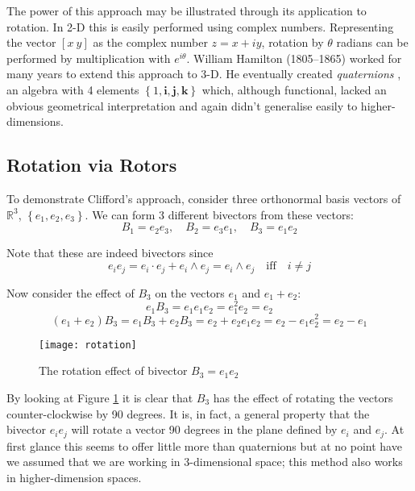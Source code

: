 The power of this approach may be illustrated through its application
to rotation. In 2-D this is easily performed using complex numbers. Representing
the vector $[x\ y]$ as the complex number $z = x + iy$, rotation by
$\theta$ radians can be performed by multiplication with $e^{i\theta}$.
William Hamilton (1805--1865) worked for many years to extend this approach
to 3-D. He eventually created \emph{quaternions} \cite{hamilton2,hamilton1},
an algebra with 4 
elements $\left\{1, \mathbf{i}, \mathbf{j}, \mathbf{k}\right\}$ which, although
functional, lacked an obvious geometrical interpretation and again didn't
generalise easily to higher-dimensions.

\subsection{Rotation via Rotors}

To demonstrate Clifford's approach, consider three orthonormal basis
vectors of $\mathbb{R}^3$, $\left\{e_1, e_2, e_3\right\}$. We can form
3 different bivectors from these vectors:
\begin{displaymath}
B_1 = e_2e_3,\quad B_2 = e_3e_1,\quad B_3 = e_1e_2
\end{displaymath}

Note that these are indeed bivectors since
\[
e_ie_j = e_i \cdot e_j + e_i \wedge e_j = e_i \wedge e_j \quad \mbox{iff} \quad i \ne j
\]

Now consider the effect of $B_3$ on the vectors $e_1$ and $e_1 + e_2$:
\begin{displaymath}
e_1B_3 = e_1e_1e_2 = e_1^2e_2=e_2 
\end{displaymath}
\begin{displaymath}
(e_1 + e_2)B_3 = e_1B_3 + e_2B_3 = e_2 + e_2e_1e_2 = e_2 - e_1e_2^2 = e_2 - e_1
\end{displaymath}

\begin{figure}
\centering
\texttt{[image: rotation]}
\caption{The rotation effect of bivector $B_3 = e_1e_2$\label{fig:rotation}}
\end{figure}

By looking at Figure \ref{fig:rotation} it is clear that $B_3$ has the
effect of rotating the vectors counter-clockwise by 90 degrees. It is, in
fact, a general property that the bivector $e_ie_j$ will rotate a
vector 90 degrees in the plane defined by $e_i$ and $e_j$. At first 
glance this seems to offer little more than quaternions but at no point 
have we assumed that we are working in 3-dimensional space; this method
also works in higher-dimension spaces.

